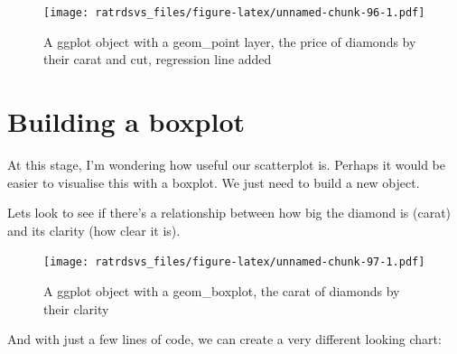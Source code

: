 \documentclass[
]{book}
\newenvironment{Shaded}{\begin{snugshade}}{\end{snugshade}}
\newcommand{\DataTypeTok}[1]{\textcolor[rgb]{0.13,0.29,0.53}{#1}}
\newcommand{\KeywordTok}[1]{\textcolor[rgb]{0.13,0.29,0.53}{\textbf{#1}}}
\newcommand{\NormalTok}[1]{#1}
\newcommand{\OperatorTok}[1]{\textcolor[rgb]{0.81,0.36,0.00}{\textbf{#1}}}
\newcommand{\StringTok}[1]{\textcolor[rgb]{0.31,0.60,0.02}{#1}}
\begin{document}
\begin{figure}
\centering
\texttt{[image: ratrdsvs\_files/figure-latex/unnamed-chunk-96-1.pdf]}
\caption{\label{fig:unnamed-chunk-96}A ggplot object with a geom\_point layer, the price of diamonds by their carat and cut, regression line added}
\end{figure}

\hypertarget{gg_boxplot}{%
\section{Building a boxplot}\label{gg_boxplot}}

At this stage, I'm wondering how useful our scatterplot is. Perhaps it would be easier to visualise this with a boxplot. We just need to build a new object.

Lets look to see if there's a relationship between how big the diamond is (carat) and its clarity (how clear it is).

\begin{Shaded}
\end{Shaded}

\begin{figure}
\centering
\texttt{[image: ratrdsvs\_files/figure-latex/unnamed-chunk-97-1.pdf]}
\caption{\label{fig:unnamed-chunk-97}A ggplot object with a geom\_boxplot, the carat of diamonds by their clarity}
\end{figure}

And with just a few lines of code, we can create a very different looking chart:

\begin{Shaded}
\end{Shaded}
\end{document}
